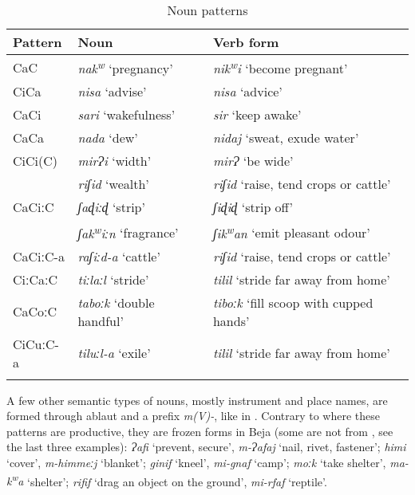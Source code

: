 \documentclass[output=paper]{langsci/langscibook}
\begin{document}
\begin{table}
\begin{tabularx}{.95\textwidth}{llX}
\lsptoprule
Pattern & Noun & Verb form\\
\midrule
CaC & \textit{nak\textsuperscript{w}} ‘pregnancy’ & \textit{nik\textsuperscript{w}}\textit{i} ‘become pregnant’\\
CiCa & \textit{nisa} ‘advise’ & \textit{nisa} ‘advice’\\
CaCi & \textit{sari} ‘wakefulness’ & \textit{sir} ‘keep awake’\\
CaCa & \textit{nada} ‘dew’ & \textit{nidaj} ‘sweat, exude water’\\
CiCi(C) & \textit{mirɁi} ‘width’ & \textit{mirɁ} ‘be wide’\\
& \textit{riʃid} ‘wealth’ & \textit{riʃid} ‘raise, tend crops or cattle’\\
CaCiːC & \textit{ʃaɖiːɖ} ‘strip’ & \textit{ʃiɖiɖ} ‘strip off’\\
& \textit{ʃak\textsuperscript{w}}\textit{iːn} ‘fragrance’ & \textit{ʃik\textsuperscript{w}}\textit{an} ‘emit pleasant odour’\\
CaCiːC-a & \textit{raʃiːd-a} ‘cattle’ & \textit{riʃid} ‘raise, tend crops or cattle’\\
CiːCaːC & \textit{tiːlaːl} ‘stride’ & \textit{tilil} ‘stride far away from home’\\
CaCoːC & \textit{taboːk} ‘double handful’ & \textit{tiboːk} ‘fill scoop with cupped hands’\\
CiCuːC-a & \textit{tiluːl-a} ‘exile’ & \textit{tilil} ‘stride far away from home’\\
\lspbottomrule
\end{tabularx} 
\caption{Noun patterns}
\label{tab:vanhove:nounpat}
\end{table}


 
 
 




A few other semantic types of nouns, mostly instrument and place names, are formed through ablaut and a prefix \textit{m(V)-}, like in . Contrary to  where these patterns are productive, they are frozen forms in Beja (some are not  from , see the last three examples): \textit{Ɂafi} ‘prevent, secure’, \textit{m\nobreakdash-Ɂafaj} ‘nail, rivet, fastener’; \textit{himi} ‘cover’, \textit{m-himmeːj} ‘blanket’; \textit{ginif} ‘kneel’, \textit{mi-gnaf} ‘camp’; \textit{moːk} ‘take shelter’, \textit{ma\nobreakdash-k\textsuperscript{w}}\textit{a} ‘shelter’; \textit{rifif} ‘drag an object on the ground’, \textit{mi-rfaf} ‘reptile’.
\end{document}
